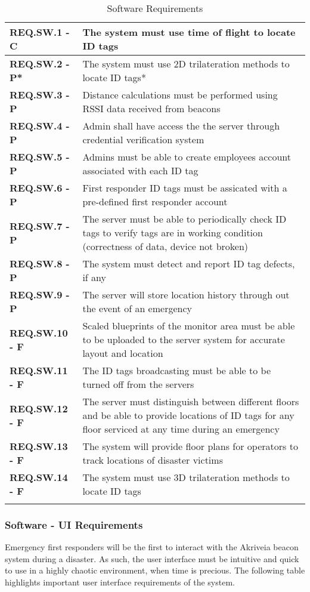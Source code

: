 \bigskip

\bgroup
\def\arraystretch{1.5}
\begin{longtable}[H]{ | m{3.5cm} | m{12.5cm} |}
 \hline
 \textbf{REQ.SW.1 - C} & The system must use time of flight to locate ID tags \\
\hline
 \textbf{REQ.SW.2 - P*} & The system must use 2D trilateration methods to locate ID tags* \\
\hline
 \textbf{REQ.SW.3 - P} & Distance calculations must be performed using RSSI data received from beacons \\
\hline
 \textbf{REQ.SW.4 - P} & Admin shall have access the the server through credential verification system \\
\hline
 \textbf{REQ.SW.5 - P} & Admins must be able to create employees account associated with each ID tag \\
\hline
 \textbf{REQ.SW.6 - P} & First responder ID tags must be assicated with a pre-defined first responder account \\
\hline
 \textbf{REQ.SW.7 - P} & The server must be able to periodically check ID tags to verify tags are in working condition (correctness of data, device not broken) \\
\hline
 \textbf{REQ.SW.8 - P} & The system must detect and report ID tag defects, if any \\
\hline
 \textbf{REQ.SW.9 - P} & The server will store location history through out the event of an emergency \\
\hline
 \textbf{REQ.SW.10 - F} & Scaled blueprints of the monitor area must be able to be uploaded to the server system for accurate layout and location \\
\hline
 \textbf{REQ.SW.11 - F} & The ID tags broadcasting must be able to be turned off from the servers \\
\hline
 \textbf{REQ.SW.12 - F} & The server must distinguish between different floors and be able to provide locations of ID tags for any floor serviced at any time during an emergency \\
\hline
 \textbf{REQ.SW.13 - F} & The system will provide floor plans for operators to track locations of disaster victims \\
\hline
 \textbf{REQ.SW.14 - F} & The system must use 3D trilateration methods to locate ID tags \\
\hline
\caption{Software Requirements}
\end{longtable}

\break
\subsubsection{Software - UI Requirements}
Emergency first responders will be the first to interact with the Akriveia beacon system during a disaster. As such, the user interface must be intuitive and quick to use in a highly chaotic environment, when time is precious. The following table highlights important user interface requirements of the system.
\bigskip

